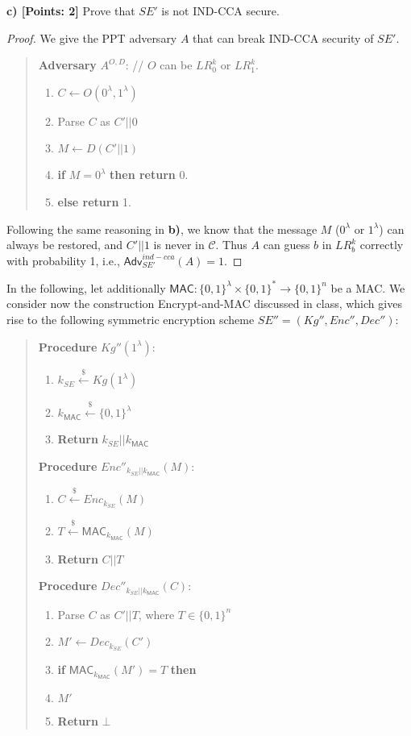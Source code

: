 \documentclass[12pt]{article}
\newcommand{\bits}{\{0,1\}}
\newcommand{\getsr}{\stackrel{\$}{\gets}}
\newcommand{\Adv}{\textsf{Adv}}
\newcommand{\tab}{\hspace{0.3in}}
\newcommand{\MAC}{\textsf{MAC}}
\newcommand{\C}{\mathcal{C}}
\theoremstyle{definition}
\begin{document}
{\bf c) [Points: 2]} Prove that $SE'$ is not IND-CCA secure.
\begin{proof}
We give the PPT adversary $A$ that can break IND-CCA security of $SE'$.
\begin{quote}
{\bf Adversary} $A^{O, D}$: // $O$ can be $LR_0^k$ or $LR_1^k$.
\begin{enumerate}
\item $C \gets O(0^\lambda, 1^\lambda)$
\item Parse $C$ as $C'||0$
\item $M \gets D(C'||1)$
\item {\bf if} $M=0^\lambda$ {\bf then return} 0.
\item {\bf else return} 1.
\end{enumerate}
\end{quote}
Following the same reasoning in {\bf b)}, we know that the message $M$ ($0^\lambda$ or $1^\lambda$) can always be restored, and $C'||1$ is never in $\C$. Thus $A$ can guess $b$ in $LR_b^k$ correctly with probability 1, i.e., $\Adv_{SE'}^{ind-cca}(A) = 1$.
\end{proof}

In the following, let additionally $\MAC : \bits^\lambda \times \bits^* \to \bits^n$ be a MAC. We consider now the construction Encrypt-and-MAC discussed in class, which gives rise to the following symmetric encryption scheme $SE'' = (Kg'', Enc'', Dec'')$:
\begin{quote}
\begin{minipage}[t]{.3\textwidth}
{\bf Procedure} $Kg''(1^\lambda)$:
\begin{enumerate}
\item $k_{SE} \getsr Kg(1^\lambda)$
\item $k_{\MAC} \getsr \bits^\lambda$
\item {\bf Return} $k_{SE}||k_{\MAC}$
\end{enumerate}
\end{minipage}
\begin{minipage}[t]{.5\textwidth}
{\bf Procedure} $Enc''_{k_{SE}||k_{\MAC}}(M)$:
\begin{enumerate}
\item $C \getsr Enc_{k_{SE}} (M)$
\item $T \getsr \MAC_{k_{\MAC}}(M)$
\item {\bf Return} $C||T$
\end{enumerate}
\end{minipage}

\begin{minipage}[t]{.5\textwidth}
{\bf Procedure} $Dec''_{k_{SE}||k_{\MAC}}(C)$:
\begin{enumerate}
\item Parse $C$ as $C'||T$, where $T \in \bits^n$
\item $M' \gets Dec_{k_{SE}} (C')$
\item {\bf if} $\MAC_{k_{\MAC}}(M') = T$ {\bf then}
\item \tab {\bf Return} $M'$
\item {\bf Return} $\bot$
\end{enumerate}
\end{minipage}
\end{quote}
\end{document}

